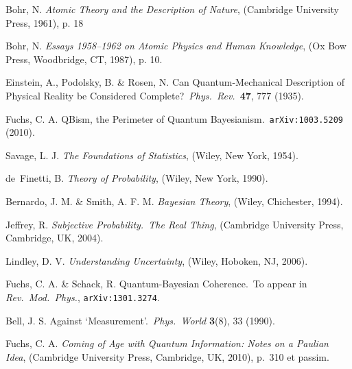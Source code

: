 \documentclass[aps,prb,superscriptaddress,12pt,tightenlines,nofootinbib]{revtex4-2}
\begin{document}
\begin{thebibliography}{99}

%
%

Bohr, N. {\sl Atomic Theory and the Description of Nature}, (Cambridge University Press, 1961), p. 18

Bohr, N. {\sl Essays 1958--1962 on Atomic Physics and Human Knowledge}, (Ox Bow Press, Woodbridge, CT, 1987), p. 10.

Einstein, A., Podolsky, B. \& Rosen, N. Can Quantum-Mechanical Description of Physical Reality be Considered Complete?\ {\sl Phys.\ Rev.}\ {\bf 47}, 777 (1935).




Fuchs, C. A. QBism, the Perimeter of Quantum Bayesianism.\ {\tt arXiv:1003.5209} (2010).

Savage, L. J. {\sl The Foundations of Statistics}, (Wiley, New York, 1954).

de~Finetti, B. {\sl Theory of Probability}, (Wiley, New York, 1990).

Bernardo, J. M. \& Smith, A. F. M. {\sl Bayesian Theory}, (Wiley, Chichester, 1994).

Jeffrey, R. {\sl Subjective Probability.\ The Real Thing}, (Cambridge University Press, Cambridge, UK, 2004).

Lindley, D. V. {\sl Understanding Uncertainty}, (Wiley, Hoboken, NJ, 2006).


Fuchs, C. A. \& Schack, R.  Quantum-Bayesian Coherence.\  To appear in {\sl Rev.\ Mod.\ Phys.}, {\tt arXiv:1301.3274}.

Bell, J. S. Against `Measurement'.\ {\sl Phys.\ World} {\bf 3}(8), 33 (1990).

Fuchs, C. A. {\sl Coming of Age with Quantum Information: Notes on a Paulian Idea},  (Cambridge University Press, Cambridge, UK, 2010), p.\ 310 et passim.


\end{thebibliography}
\end{document}
